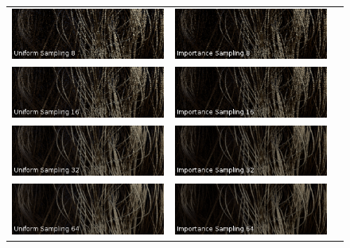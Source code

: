 \documentclass[11pt,a4paper]{report}
\begin{document}
\begin{figure}
\begin{center}
\begin{tabular}{ccc}
\includegraphics[scale=0.57]{variance-results/un8.png} & \includegraphics[scale=0.57]{variance-results/is8.png} \\
\includegraphics[scale=0.57]{variance-results/un16.png} & \includegraphics[scale=0.57]{variance-results/is16.png} \\
\includegraphics[scale=0.57]{variance-results/un32.png} & \includegraphics[scale=0.57]{variance-results/is32.png} \\
\includegraphics[scale=0.57]{variance-results/un64.png} & \includegraphics[scale=0.57]{variance-results/is64.png} \\

\end{tabular}
\end{center}
\end{figure}
\end{document}
